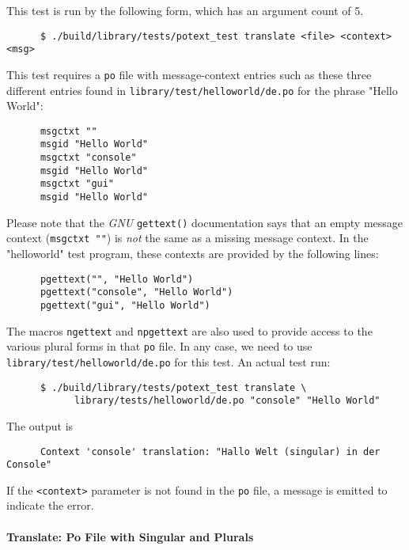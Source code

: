    This test is run by the following form, which has an argument count
   of 5.

   \begin{verbatim}
      $ ./build/library/tests/potext_test translate <file> <context> <msg>
   \end{verbatim}

   This test requires a \texttt{po} file with message-context
   entries such as these three different entries found in
   \texttt{library/test/helloworld/de.po} for the phrase
   "Hello World":

   \begin{verbatim}
      msgctxt ""
      msgid "Hello World"
      msgctxt "console"
      msgid "Hello World"
      msgctxt "gui"
      msgid "Hello World"
   \end{verbatim}

   Please note that the \textsl{GNU} \texttt{gettext()} documentation says
   that an empty message context (\texttt{msgctxt ""}) is \textsl{not}
   the same as a missing message context.
   In the "helloworld" test program, these contexts are provided by the
   following lines:

   \begin{verbatim}
      pgettext("", "Hello World")
      pgettext("console", "Hello World")
      pgettext("gui", "Hello World")
   \end{verbatim}

   The macros \texttt{ngettext} and \texttt{npgettext} are also used to provide
   access to the various plural forms in that \texttt{po} file.
   In any case, we need to use 
   \texttt{library/test/helloworld/de.po} for this test.
   An actual test run:

   \begin{verbatim}
      $ ./build/library/tests/potext_test translate \
            library/tests/helloworld/de.po "console" "Hello World"
   \end{verbatim}

   The output is

   \begin{verbatim}
      Context 'console' translation: "Hallo Welt (singular) in der Console"
   \end{verbatim}

   If the \texttt{<context>} parameter is not found in the \texttt{po}
   file, a message is emitted to indicate the error.

\paragraph{Translate: Po File with Singular and Plurals}
\label{paragraph:potext_test_translate_po_singular_plural}

